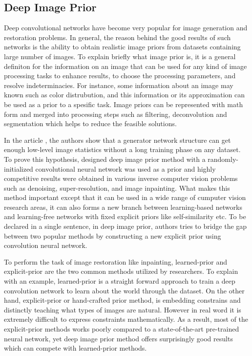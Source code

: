 \subsection{Deep Image Prior}

Deep convolutional networks have become very popular for image generation and restoration problems. In general, the reason behind the good results of such networks is the ability to obtain realistic image priors from datasets containing large number of images. To explain briefly what image prior is, it is a general definiton for the information on an image that can be used for any kind of image processing tasks to enhance results, to choose the processing parameters, and resolve indeterminacies. For instance, some information about an image may known such as color distrubution, and this information or its approximation can be used as a prior to a spesific task. Image priors can be represented with math form and merged into processing steps such as filtering, deconvolution and segmentation which helps to reduce the feasible solutions.

In the article \cite{deep_image_prior}, the authors show that a generator network structure can get enough low-level image statistics without a long training phase on any dataset. To prove this hypothesis, designed deep image prior method with a randomly-initialized convolutional neural network was used as a prior and highly competitive results were obtained in various inverse computer vision problems such as denoising, super-resolution, and image inpainting. What makes this method important except that it can be used in a wide range of cumputer vision research areas, it can also forms a new branch between learning-based networks and learning-free networks with fixed explicit priors like self-similarity etc. To be declared in a single sentence, in deep image prior, authors tries to bridge the gap between two popular methods by constructing a new explicit prior using convolution neural network.

To perform the task of image restoration like inpainting, learned-prior and explicit-prior are the two common methods utilized by researchers. To explain with an example, learned-prior is a straight forward approach to train a deep convolution network to learn about the world through the dataset. On the other hand, explicit-prior or hand-crafted prior method, is embedding constrains and distinctly teaching what types of images are natural. However in real word it is extremely difficult to express constraints mathematically. As a result, most of the explicit-prior methods works poorly compared to a state-of-the-art pre-trained neural network, yet deep image prior method offers surprisingly good results which can compete with learned-prior methods.

